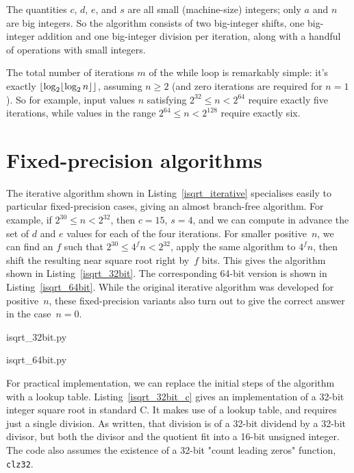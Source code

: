 \documentclass[a4paper]{article}
\DeclarePairedDelimiter\floor{\lfloor}{\rfloor}
\theoremstyle{plain}
\theoremstyle{definition}
\begin{document}
The quantities $c$, $d$, $e$, and $s$ are all small (machine-size) integers;
only $a$ and $n$ are big integers. So the algorithm consists of two big-integer
shifts, one big-integer addition and one big-integer division per iteration,
along with a handful of operations with small integers.

The total number of iterations $m$ of the while loop is remarkably simple: it's
exactly $\floor*{\log_2 \floor{\log_2 n}}$, assuming $n\ge 2$ (and zero
iterations are required for $n = 1$). So for example, input values $n$
satisfying $2^{32} \le n < 2^{64}$ require exactly five iterations, while
values in the range $2^{64} \le n < 2^{128}$ require exactly six.

\section{Fixed-precision algorithms}

The iterative algorithm shown in Listing~\ref{isqrt_iterative} specialises
easily to particular fixed-precision cases, giving an almost branch-free
algorithm. For example, if $2^{30} \le n < 2^{32}$, then $c = 15$, $s=4$, and
we can compute in advance the set of $d$ and $e$ values for each of the four
iterations. For smaller positive~$n$, we can find an $f$ such that $2^{30} \le
4^f n < 2^{32}$, apply the same algorithm to $4^f n$, then shift the resulting
near square root right by~$f$ bits. This gives the algorithm shown in
Listing~\ref{isqrt_32bit}. The corresponding 64-bit version is shown in
Listing~\ref{isqrt_64bit}. While the original iterative algorithm was developed for
positive~$n$, these fixed-precision variants also turn out to give the correct
answer in the case~$n = 0$.


  {isqrt_32bit.py}


  {isqrt_64bit.py}

For practical implementation, we can replace the initial steps of the algorithm
with a lookup table. Listing~\ref{isqrt_32bit_c} gives an implementation of a
32-bit integer square root in standard C. It makes use of a lookup table, and
requires just a single division. As written, that division is of a 32-bit
dividend by a 32-bit divisor, but both the divisor and the quotient fit into a
16-bit unsigned integer. The code also assumes the existence of a 32-bit "count
leading zeros" function, \lstinline$clz32$.
\end{document}
